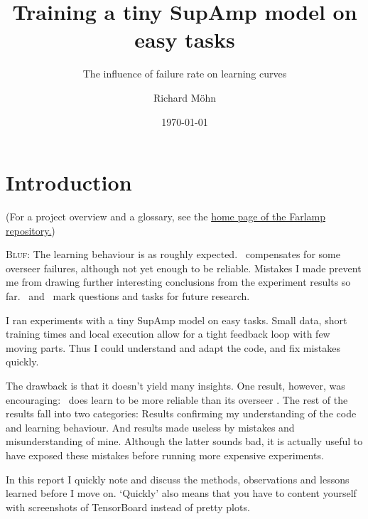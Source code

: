 \documentclass{farlamp}
\title{Training a tiny SupAmp model on easy tasks}
\subtitle{The influence of failure rate on learning curves}
\author{Richard Möhn}
\date{\today}
\begin{document}
\maketitle
\tableofcontents

\section{Introduction}

(For a project overview and a glossary, see the
\href{https://github.com/rmoehn/farlamp}{home page of the Farlamp repository.})

\textsc{Bluf}: The learning behaviour is as roughly expected. \Xpa\ compensates
for some overseer failures, although not yet enough to be reliable. Mistakes I
made prevent me from drawing further interesting conclusions from the experiment
results so far. \OQsymbol\ and \TODOsymbol\ mark questions and tasks for future
research.

I ran experiments with a tiny SupAmp model on easy tasks. Small data, short
training times and local execution allow for a tight feedback loop with few
moving parts. Thus I could understand and adapt the code, and fix mistakes
quickly.

The drawback is that it doesn't yield many insights. One result, however, was
encouraging: \Xpa\ does learn to be more reliable than its overseer \AmpHp. The
rest of the results fall into two categories: Results confirming my
understanding of the code and learning behaviour. And results made useless by
mistakes and misunderstanding of mine. Although the latter sounds bad, it is
actually useful to have exposed these mistakes before running more expensive
experiments.

In this report I quickly note and discuss the methods, observations and lessons
learned before I move on. ‘Quickly’ also means that you have to content yourself
with screenshots of TensorBoard instead of pretty plots.


\end{document}
